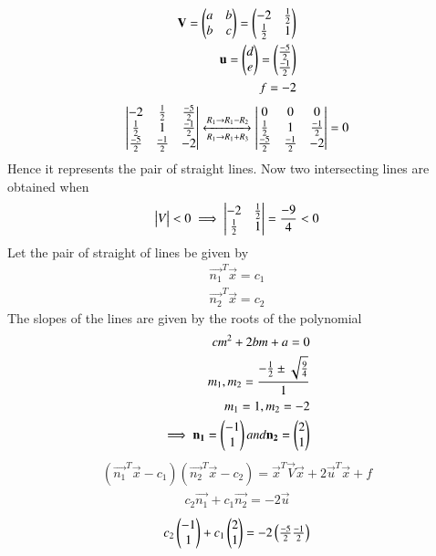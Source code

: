 \begin{align}
\mathbf{V}=\begin{pmatrix}a&b\\b&c\end{pmatrix}=\begin{pmatrix}-2&\frac{1}{2}\\\frac{1}{2}&1\end{pmatrix}\\
\mathbf{u}=\begin{pmatrix}d\\e\end{pmatrix}=\begin{pmatrix}\frac{-5}{2}\\\frac{-1}{2}\end{pmatrix}\\
f=-2
\end{align}
\begin{align}
\begin{vmatrix}
-2&\frac{1}{2}&\frac{-5}{2}\\
\frac{1}{2}&1&\frac{-1}{2}\\
\frac{-5}{2}&\frac{-1}{2}&-2\end{vmatrix}
\xleftrightarrow[R_1\rightarrow R_1+R_3]{R_1\rightarrow R_1-R_2}
\begin{vmatrix}
0&0&0\\
\frac{1}{2}&1&\frac{-1}{2}\\
\frac{-5}{2}&\frac{-1}{2}&-2\end{vmatrix}=0
\end{align}
Hence it represents the pair of straight lines.
Now two intersecting lines are obtained when
\begin{align}
\begin{vmatrix}V\end{vmatrix} < 0 
\implies \begin{vmatrix}-2&\frac{1}{2}\\\frac{1}{2}&1\end{vmatrix}
=\frac{-9}{4} < 0
\end{align}
Let the pair of straight of lines be given by
\begin{align}
\vec{n_1}^T\vec{x}=c_1\\
\vec{n_2}^T\vec{x}=c_2
\end{align}
The slopes of the lines are given by the roots of the polynomial 
\begin{align}
cm^2+2bm+a=0 \\
m_1,m_2 = \frac{-\frac{1}{2}\pm\sqrt{\frac{9}{4}}}{1}\\
m_1= 1 , m_2 =-2\\
\implies\mathbf{n_1}=\begin{pmatrix}-1\\1\end{pmatrix} and \mathbf{n_2}=\begin{pmatrix}2\\1\end{pmatrix}
\end{align}
\begin{align}
(\vec{n_1}^T\vec{x}-c_1)(\vec{n_2}^T\vec{x}-c_2) =
\vec{x}^T\vec{V}\vec{x}+2\vec{u}^T\vec{x}+f 
\end{align}
\begin{align}
c_2\vec{n_1}+c_1\vec{n_2} =-2\vec{u}
 \end{align}
 \begin{align}
 c_2\begin{pmatrix}-1\\1\end{pmatrix}+c_1\begin{pmatrix}2\\1\end{pmatrix} =-2\begin{pmatrix}\frac{-5}{2}\frac{-1}{2}\end{pmatrix}
 \end{align}
